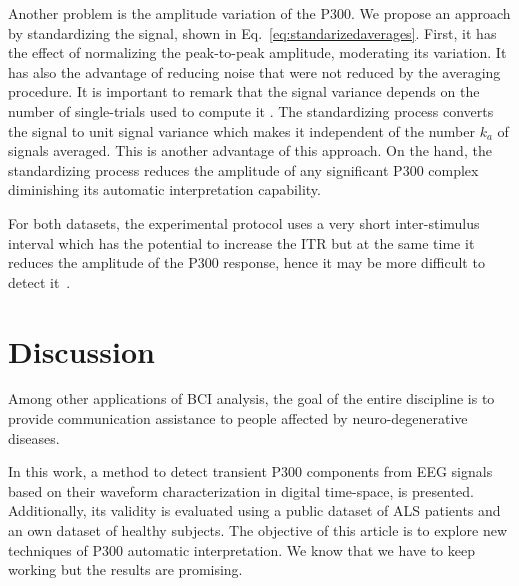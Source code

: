 \documentclass[utf8]{frontiersSCNS} %
\begin{document}
Another problem is the amplitude variation of the P300. We propose an approach by standardizing the signal, shown in Eq.~\ref{eq:standarizedaverages}.  First, it has the effect of normalizing the peak-to-peak amplitude, moderating its variation. It has also the advantage of reducing noise that were not reduced by the averaging procedure.   It is important to remark that the signal variance depends on the number of single-trials used to compute it \citep{van2006signal}.  The standardizing process converts the signal to unit signal variance which makes it independent of the number $k_a$ of signals averaged.   This is another advantage of this approach.  On the hand, the standardizing process reduces the amplitude of any significant P300 complex diminishing its automatic interpretation capability.

For both datasets, the experimental protocol uses a very short inter-stimulus interval which has the potential to increase the ITR but at the same time it reduces the amplitude of the P300 response, hence it may be more difficult to detect it~\citep{Rao2013}.  


\section{Discussion}
\label{discussion}



Among other applications of BCI analysis, the goal of the entire discipline is to provide communication assistance to people affected by neuro-degenerative diseases.

In this work, a method to detect transient P300 components from EEG signals based on their waveform characterization in digital time-space, is presented.  Additionally, its validity is evaluated using a public dataset of ALS patients and an own dataset of healthy subjects. The objective of this article is to explore new techniques of P300 automatic interpretation.  
We know that we have to keep working but the results are promising. 
\end{document}
